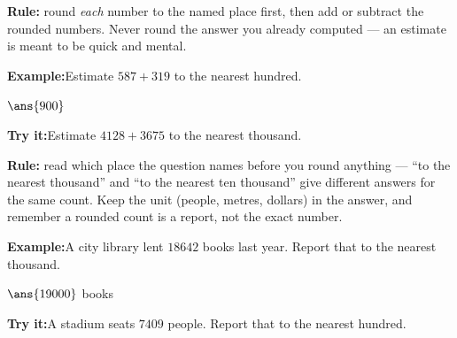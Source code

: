 \documentclass[12pt]{article}
\begin{document}
\begin{formulabox}
\textbf{Rule:} round \emph{each} number to the named place first, then add or
subtract the rounded numbers. Never round the answer you already computed --- an
estimate is meant to be quick and mental.
\end{formulabox}
\begin{examplebox}
\textbf{Example:}\quad Estimate $587 + 319$ to the nearest hundred.
\par
$\ans{900}$
\end{examplebox}
\begin{tryitbox}
\textbf{Try it:}\quad Estimate $4128 + 3675$ to the nearest thousand.\\[2pt]
\end{tryitbox}

\begin{formulabox}
\textbf{Rule:} read which place the question names before you round anything ---
``to the nearest thousand'' and ``to the nearest ten thousand'' give different
answers for the same count. Keep the unit (people, metres, dollars) in the
answer, and remember a rounded count is a report, not the exact number.
\end{formulabox}
\begin{examplebox}
\textbf{Example:}\quad A city library lent $18642$ books last year. Report that
to the nearest thousand.
\par
$\ans{19000}$ books
\end{examplebox}
\begin{tryitbox}
\textbf{Try it:}\quad A stadium seats $7409$ people. Report that to the nearest
hundred.\\[2pt]
\end{tryitbox}
\end{document}
